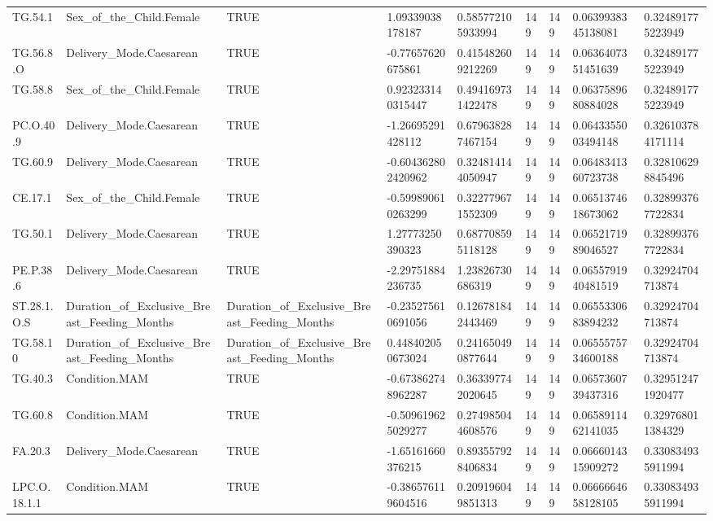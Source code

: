 \begin{longtable}{lllllllll}
TG.54.1 & Sex\_of\_the\_Child.Female & TRUE & 1.09339038178187 & 0.585772105933994 & 149 & 149 & 0.0639938345138081 & 0.324891775223949 \\
TG.56.8.O & Delivery\_Mode.Caesarean & TRUE & -0.77657620675861 & 0.415482609212269 & 149 & 149 & 0.0636407351451639 & 0.324891775223949 \\
TG.58.8 & Sex\_of\_the\_Child.Female & TRUE & 0.923233140315447 & 0.494169731422478 & 149 & 149 & 0.0637589680884028 & 0.324891775223949 \\
PC.O.40.9 & Delivery\_Mode.Caesarean & TRUE & -1.26695291428112 & 0.679638287467154 & 149 & 149 & 0.0643355003494148 & 0.326103784171114 \\
TG.60.9 & Delivery\_Mode.Caesarean & TRUE & -0.604362802420962 & 0.324814144050947 & 149 & 149 & 0.0648341360723738 & 0.328106298845496 \\
CE.17.1 & Sex\_of\_the\_Child.Female & TRUE & -0.599890610263299 & 0.322779671552309 & 149 & 149 & 0.0651374618673062 & 0.328993767722834 \\
TG.50.1 & Delivery\_Mode.Caesarean & TRUE & 1.27773250390323 & 0.687708595118128 & 149 & 149 & 0.0652171989046527 & 0.328993767722834 \\
PE.P.38.6 & Delivery\_Mode.Caesarean & TRUE & -2.29751884236735 & 1.23826730686319 & 149 & 149 & 0.0655791940481519 & 0.32924704713874 \\
ST.28.1.O.S & Duration\_of\_Exclusive\_Breast\_Feeding\_Months & Duration\_of\_Exclusive\_Breast\_Feeding\_Months & -0.235275610691056 & 0.126781842443469 & 149 & 149 & 0.0655330683894232 & 0.32924704713874 \\
TG.58.10 & Duration\_of\_Exclusive\_Breast\_Feeding\_Months & Duration\_of\_Exclusive\_Breast\_Feeding\_Months & 0.448402050673024 & 0.241650490877644 & 149 & 149 & 0.0655575734600188 & 0.32924704713874 \\
TG.40.3 & Condition.MAM & TRUE & -0.673862748962287 & 0.363397742020645 & 149 & 149 & 0.0657360739437316 & 0.329512471920477 \\
TG.60.8 & Condition.MAM & TRUE & -0.509619625029277 & 0.274985044608576 & 149 & 149 & 0.0658911462141035 & 0.329768011384329 \\
FA.20.3 & Delivery\_Mode.Caesarean & TRUE & -1.65161660376215 & 0.893557928406834 & 149 & 149 & 0.0666014315909272 & 0.330834935911994 \\
LPC.O.18.1.1 & Condition.MAM & TRUE & -0.386576119604516 & 0.209196049851313 & 149 & 149 & 0.0666664658128105 & 0.330834935911994 \\

\end{longtable}
